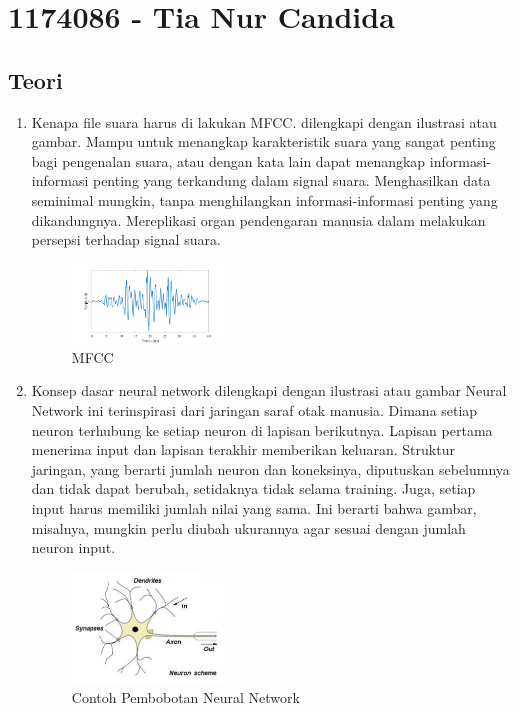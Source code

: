 \section{1174086 - Tia Nur Candida}
\subsection{Teori}
\begin{enumerate}
	\item Kenapa file suara harus di lakukan MFCC. dilengkapi dengan ilustrasi atau gambar.
	\hfill\break
	Mampu untuk menangkap karakteristik suara yang sangat penting bagi pengenalan suara, atau dengan kata lain dapat menangkap informasi-informasi penting yang terkandung dalam signal suara. Menghasilkan data seminimal mungkin, tanpa menghilangkan informasi-informasi penting yang dikandungnya. Mereplikasi organ pendengaran manusia dalam melakukan persepsi terhadap signal suara.
	\begin{figure}[H]
		\includegraphics[width=4cm]{figures/1174086/6/7.png}
		\centering
		\caption{MFCC}
	\end{figure}
	
	
	\item Konsep dasar neural network dilengkapi dengan ilustrasi atau gambar
	\hfill\break
	Neural Network ini terinspirasi dari jaringan saraf otak manusia. Dimana setiap neuron terhubung ke setiap neuron di lapisan berikutnya. Lapisan pertama menerima input dan lapisan terakhir memberikan keluaran. Struktur jaringan, yang berarti jumlah neuron dan koneksinya, diputuskan sebelumnya dan tidak dapat berubah, setidaknya tidak selama training. Juga, setiap input harus memiliki jumlah nilai yang sama. Ini berarti bahwa gambar, misalnya, mungkin perlu diubah ukurannya agar sesuai dengan jumlah neuron input.
	\begin{figure}[H]
		\includegraphics[width=4cm]{figures/1174086/6/8.jpg}
		\centering
		\caption{Contoh Pembobotan Neural Network}
	\end{figure}


\end{enumerate}
